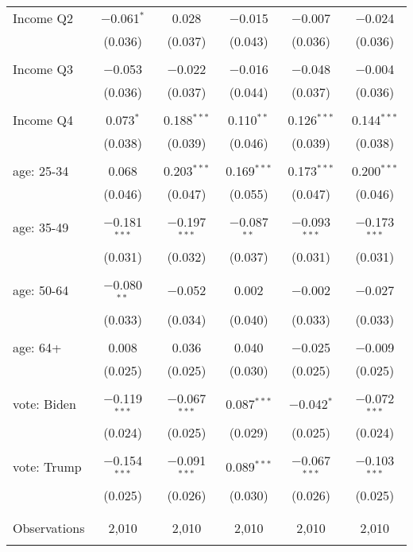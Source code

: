 \begin{tabular}{@{\extracolsep{5pt}}lccccc}
 Income Q2 & $-$0.061$^{*}$ & 0.028 & $-$0.015 & $-$0.007 & $-$0.024 \\ 
  & (0.036) & (0.037) & (0.043) & (0.036) & (0.036) \\ 
  & & & & & \\ 
 Income Q3 & $-$0.053 & $-$0.022 & $-$0.016 & $-$0.048 & $-$0.004 \\ 
  & (0.036) & (0.037) & (0.044) & (0.037) & (0.036) \\ 
  & & & & & \\ 
 Income Q4 & 0.073$^{*}$ & 0.188$^{***}$ & 0.110$^{**}$ & 0.126$^{***}$ & 0.144$^{***}$ \\ 
  & (0.038) & (0.039) & (0.046) & (0.039) & (0.038) \\ 
  & & & & & \\ 
 age: 25-34 & 0.068 & 0.203$^{***}$ & 0.169$^{***}$ & 0.173$^{***}$ & 0.200$^{***}$ \\ 
  & (0.046) & (0.047) & (0.055) & (0.047) & (0.046) \\ 
  & & & & & \\ 
 age: 35-49 & $-$0.181$^{***}$ & $-$0.197$^{***}$ & $-$0.087$^{**}$ & $-$0.093$^{***}$ & $-$0.173$^{***}$ \\ 
  & (0.031) & (0.032) & (0.037) & (0.031) & (0.031) \\ 
  & & & & & \\ 
 age: 50-64 & $-$0.080$^{**}$ & $-$0.052 & 0.002 & $-$0.002 & $-$0.027 \\ 
  & (0.033) & (0.034) & (0.040) & (0.033) & (0.033) \\ 
  & & & & & \\ 
 age: 64+ & 0.008 & 0.036 & 0.040 & $-$0.025 & $-$0.009 \\ 
  & (0.025) & (0.025) & (0.030) & (0.025) & (0.025) \\ 
  & & & & & \\ 
 vote: Biden & $-$0.119$^{***}$ & $-$0.067$^{***}$ & 0.087$^{***}$ & $-$0.042$^{*}$ & $-$0.072$^{***}$ \\ 
  & (0.024) & (0.025) & (0.029) & (0.025) & (0.024) \\ 
  & & & & & \\ 
 vote: Trump & $-$0.154$^{***}$ & $-$0.091$^{***}$ & 0.089$^{***}$ & $-$0.067$^{***}$ & $-$0.103$^{***}$ \\ 
  & (0.025) & (0.026) & (0.030) & (0.026) & (0.025) \\ 
  & & & & & \\ 
\hline \\[-1.8ex] 

Observations & 2,010 & 2,010 & 2,010 & 2,010 & 2,010 \\ 
\hline 
\hline \\[-1.8ex] 
\end{tabular} 